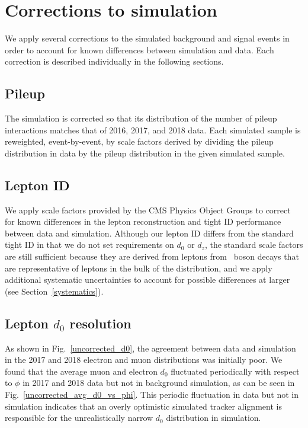 \section{Corrections to simulation}
\label{corrections}

We apply several corrections to the simulated background and signal events in order to account for known differences between simulation and data. Each correction is described individually in the following sections.

\subsection{Pileup}
The  simulation is corrected so that its distribution of the number of pileup interactions matches that of 2016, 2017, and 2018 data. Each simulated sample is reweighted, event-by-event, by scale factors derived by dividing the pileup distribution in data by the pileup distribution in the given simulated sample.

\subsection{Lepton ID}
We apply scale factors provided by the CMS Physics Object Groups to correct for known differences in the lepton reconstruction and tight ID performance between data and simulation. Although our lepton ID differs from the standard tight ID in that we do not set requirements on $d_0$ or $d_z$, the standard scale factors are still sufficient because they are derived from leptons from \cPZ\ boson decays that are representative of leptons in the bulk of the \ad distribution, and we apply additional systematic uncertainties to account for possible differences at larger \ad (see Section~\ref{systematics}).

\subsection{Lepton $d_0$ resolution}
\label{d0_smearing}
As shown in Fig.~\ref{uncorrected_d0}, the agreement between data and simulation in the 2017 and 2018 electron and muon \ad distributions was initially poor. We found that the average muon and electron $d_0$ fluctuated periodically with respect to $\phi$ in 2017 and 2018 data but not in background simulation, as can be seen in Fig.~\ref{uncorrected_avg_d0_vs_phi}. This periodic fluctuation in data but not in simulation indicates that an overly optimistic simulated tracker alignment is responsible for the unrealistically narrow $d_0$ distribution in simulation.

